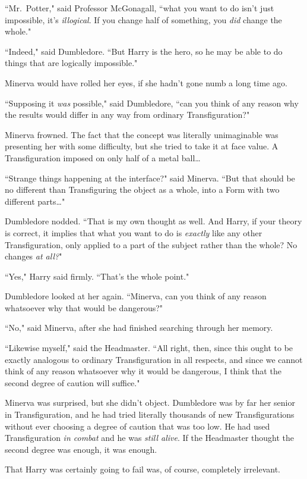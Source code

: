``Mr.~Potter," said Professor McGonagall, ``what you want to do isn't just impossible, it's \emph{illogical}. If you change half of something, you \emph{did} change the whole."

``Indeed," said Dumbledore. ``But Harry is the hero, so he may be able to do things that are logically impossible."

Minerva would have rolled her eyes, if she hadn't gone numb a long time ago.

``Supposing it \emph{was} possible," said Dumbledore, ``can you think of any reason why the results would differ in any way from ordinary Transfiguration?"

Minerva frowned. The fact that the concept was literally unimaginable was presenting her with some difficulty, but she tried to take it at face value. A Transfiguration imposed on only half of a metal ball{\ldots}

``Strange things happening at the interface?" said Minerva. ``But that should be no different than Transfiguring the object as a whole, into a Form with two different parts{\ldots}"

Dumbledore nodded. ``That is my own thought as well. And Harry, if your theory is correct, it implies that what you want to do is \emph{exactly} like any other Transfiguration, only applied to a part of the subject rather than the whole? No changes \emph{at all?}"

``Yes," Harry said firmly. ``That's the whole point."

Dumbledore looked at her again. ``Minerva, can you think of any reason whatsoever why that would be dangerous?"

``No," said Minerva, after she had finished searching through her memory.

``Likewise myself," said the Headmaster. ``All right, then, since this ought to be exactly analogous to ordinary Transfiguration in all respects, and since we cannot think of any reason whatsoever why it would be dangerous, I think that the second degree of caution will suffice."

Minerva was surprised, but she didn't object. Dumbledore was by far her senior in Transfiguration, and he had tried literally thousands of new Transfigurations without ever choosing a degree of caution that was too low. He had used Transfiguration \emph{in combat} and he was \emph{still alive}. If the Headmaster thought the second degree was enough, it was enough.

That Harry was certainly going to fail was, of course, completely irrelevant.


